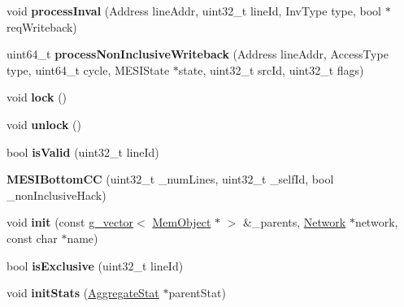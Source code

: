\begin{DoxyCompactItemize}
\item 
\hypertarget{classMESIBottomCC_abf24d8aff75aeef0d89e90e6006adbe7}{void {\bfseries process\-Inval} (Address line\-Addr, uint32\-\_\-t line\-Id, Inv\-Type type, bool $\ast$req\-Writeback)}\label{classMESIBottomCC_abf24d8aff75aeef0d89e90e6006adbe7}

\item 
\hypertarget{classMESIBottomCC_ac2b2916af63b5fb75e24b5659c54e1fd}{uint64\-\_\-t {\bfseries process\-Non\-Inclusive\-Writeback} (Address line\-Addr, Access\-Type type, uint64\-\_\-t cycle, M\-E\-S\-I\-State $\ast$state, uint32\-\_\-t src\-Id, uint32\-\_\-t flags)}\label{classMESIBottomCC_ac2b2916af63b5fb75e24b5659c54e1fd}

\item 
\hypertarget{classMESIBottomCC_a08911f3e7f3f4d1b84532a06186cdb57}{void {\bfseries lock} ()}\label{classMESIBottomCC_a08911f3e7f3f4d1b84532a06186cdb57}

\item 
\hypertarget{classMESIBottomCC_aed3169349f616a6f662c1698e0ef4956}{void {\bfseries unlock} ()}\label{classMESIBottomCC_aed3169349f616a6f662c1698e0ef4956}

\item 
\hypertarget{classMESIBottomCC_aa88f5fe706c2754c4a52b5ded557209e}{bool {\bfseries is\-Valid} (uint32\-\_\-t line\-Id)}\label{classMESIBottomCC_aa88f5fe706c2754c4a52b5ded557209e}

\item 
\hypertarget{classMESIBottomCC_aa28d6e141e8e31979f831a04a1c0e284}{{\bfseries M\-E\-S\-I\-Bottom\-C\-C} (uint32\-\_\-t \-\_\-num\-Lines, uint32\-\_\-t \-\_\-self\-Id, bool \-\_\-non\-Inclusive\-Hack)}\label{classMESIBottomCC_aa28d6e141e8e31979f831a04a1c0e284}

\item 
\hypertarget{classMESIBottomCC_a98a9b5ff311ca61f7af33b68f1f25a64}{void {\bfseries init} (const \hyperlink{classg__vector}{g\-\_\-vector}$<$ \hyperlink{classMemObject}{Mem\-Object} $\ast$ $>$ \&\-\_\-parents, \hyperlink{classNetwork}{Network} $\ast$network, const char $\ast$name)}\label{classMESIBottomCC_a98a9b5ff311ca61f7af33b68f1f25a64}

\item 
\hypertarget{classMESIBottomCC_ae35ac6f1be8b2afdf0b2bec49aef3d16}{bool {\bfseries is\-Exclusive} (uint32\-\_\-t line\-Id)}\label{classMESIBottomCC_ae35ac6f1be8b2afdf0b2bec49aef3d16}

\item 
\hypertarget{classMESIBottomCC_ab97d17c60463a4f917beefb776310f4a}{void {\bfseries init\-Stats} (\hyperlink{classAggregateStat}{Aggregate\-Stat} $\ast$parent\-Stat)}\label{classMESIBottomCC_ab97d17c60463a4f917beefb776310f4a}


\end{DoxyCompactItemize}
